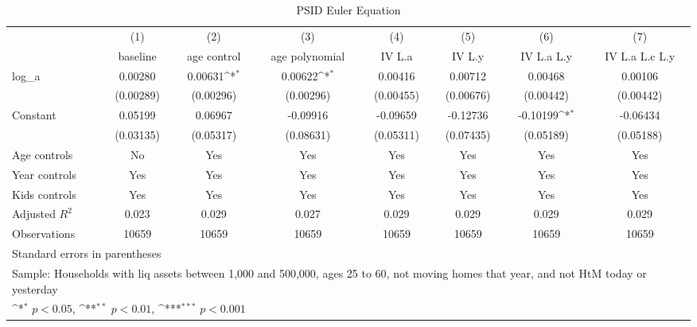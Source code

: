 {
\def\sym#1{\ifmmode^{#1}\else\(^{#1}\)\fi}
\begin{longtable}{l*{7}{c}}
\caption{PSID Euler Equation}\\
\toprule\endfirsthead\midrule\endhead\midrule\endfoot\endlastfoot
                    &\multicolumn{1}{c}{(1)}&\multicolumn{1}{c}{(2)}&\multicolumn{1}{c}{(3)}&\multicolumn{1}{c}{(4)}&\multicolumn{1}{c}{(5)}&\multicolumn{1}{c}{(6)}&\multicolumn{1}{c}{(7)}\\
                    &\multicolumn{1}{c}{baseline}&\multicolumn{1}{c}{age control}&\multicolumn{1}{c}{age polynomial}&\multicolumn{1}{c}{IV L.a}&\multicolumn{1}{c}{IV L.y}&\multicolumn{1}{c}{IV L.a L.y}&\multicolumn{1}{c}{IV L.a L.c L.y}\\
\midrule
log\_a               &     0.00280         &     0.00631\sym{*}  &     0.00622\sym{*}  &     0.00416         &     0.00712         &     0.00468         &     0.00106         \\
                    &   (0.00289)         &   (0.00296)         &   (0.00296)         &   (0.00455)         &   (0.00676)         &   (0.00442)         &   (0.00442)         \\
\addlinespace
Constant            &     0.05199         &     0.06967         &    -0.09916         &    -0.09659         &    -0.12736         &    -0.10199\sym{*}  &    -0.06434         \\
                    &   (0.03135)         &   (0.05317)         &   (0.08631)         &   (0.05311)         &   (0.07435)         &   (0.05189)         &   (0.05188)         \\
\addlinespace
Age controls        &          No         &         Yes         &         Yes         &         Yes         &         Yes         &         Yes         &         Yes         \\
\addlinespace
Year controls       &         Yes         &         Yes         &         Yes         &         Yes         &         Yes         &         Yes         &         Yes         \\
\addlinespace
Kids controls       &         Yes         &         Yes         &         Yes         &         Yes         &         Yes         &         Yes         &         Yes         \\
\midrule
Adjusted \(R^{2}\)  &       0.023         &       0.029         &       0.027         &       0.029         &       0.029         &       0.029         &       0.029         \\
Observations        &       10659         &       10659         &       10659         &       10659         &       10659         &       10659         &       10659         \\
\bottomrule
\multicolumn{8}{l}{\footnotesize Standard errors in parentheses}\\
\multicolumn{8}{l}{\footnotesize Sample: Households with liq assets between 1,000 and 500,000, ages 25 to 60, not moving homes that year, and not HtM today or yesterday}\\
\multicolumn{8}{l}{\footnotesize \sym{*} \(p<0.05\), \sym{**} \(p<0.01\), \sym{***} \(p<0.001\)}\\
\end{longtable}
}
